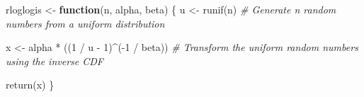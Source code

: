 \documentclass[
]{article}
\newenvironment{Shaded}{\begin{snugshade}}{\end{snugshade}}
\newcommand{\CommentTok}[1]{\textcolor[rgb]{0.56,0.35,0.01}{\textit{#1}}}
\newcommand{\ControlFlowTok}[1]{\textcolor[rgb]{0.13,0.29,0.53}{\textbf{#1}}}
\newcommand{\DecValTok}[1]{\textcolor[rgb]{0.00,0.00,0.81}{#1}}
\newcommand{\FunctionTok}[1]{\textcolor[rgb]{0.00,0.00,0.00}{#1}}
\newcommand{\NormalTok}[1]{#1}
\newcommand{\OtherTok}[1]{\textcolor[rgb]{0.56,0.35,0.01}{#1}}
\newcommand{\SpecialCharTok}[1]{\textcolor[rgb]{0.00,0.00,0.00}{#1}}
\begin{document}
\begin{Shaded}
\begin{Highlighting}[]
\NormalTok{rloglogis }\OtherTok{\textless{}{-}} \ControlFlowTok{function}\NormalTok{(n, alpha, beta) \{}
\NormalTok{  u }\OtherTok{\textless{}{-}} \FunctionTok{runif}\NormalTok{(n)  }\CommentTok{\# Generate n random numbers from a uniform distribution}
  
\NormalTok{  x }\OtherTok{\textless{}{-}}\NormalTok{ alpha }\SpecialCharTok{*}\NormalTok{ ((}\DecValTok{1} \SpecialCharTok{/}\NormalTok{ u }\SpecialCharTok{{-}} \DecValTok{1}\NormalTok{)}\SpecialCharTok{\^{}}\NormalTok{(}\SpecialCharTok{{-}}\DecValTok{1} \SpecialCharTok{/}\NormalTok{ beta))  }\CommentTok{\# Transform the uniform random numbers using the inverse CDF}
  
  \FunctionTok{return}\NormalTok{(x)}
\NormalTok{\}}


\end{Highlighting}
\end{Shaded}
\end{document}
